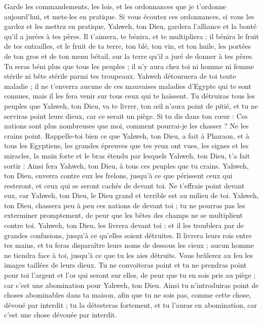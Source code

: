 \begin{multicols}{2}
Garde les commandements, les lois, et les ordonnances que je t’ordonne aujourd'hui, et mets-les en pratique.
Si vous écoutez ces ordonnances, si vous les gardez et les mettez en pratique, Yahweh, ton Dieu, gardera l'alliance et la bonté qu'il a jurées à tes pères.
Il t'aimera, te bénira, et te multipliera ; il bénira le fruit de tes entrailles, et le fruit de ta terre, ton blé, ton vin, et ton huile, les portées de ton gros et de ton menu bétail, sur la terre qu'il a juré de donner à tes pères.
Tu seras béni plus que tous les peuples ; il n'y aura chez toi ni homme ni femme stérile ni bête stérile parmi tes troupeaux.
Yahweh détournera de toi toute maladie ; il ne t’enverra aucune de ces mauvaises maladies d'Egypte qui te sont connues, mais il les fera venir sur tous ceux qui te haïssent.
Tu détruiras tous les peuples que Yahweh, ton Dieu, va te livrer, ton œil n’aura point de pitié, et tu ne serviras point leurs dieux, car ce serait un piège.
Si tu dis dans ton cœur : Ces nations sont plus nombreuses que moi, comment pourrai-je les chasser ?
Ne les crains point. Rappelle-toi bien ce que Yahweh, ton Dieu, a fait à Pharaon, et à tous les Egyptiens,
les grandes épreuves que tes yeux ont vues, les signes et les miracles, la main forte et le bras étendu par lesquels Yahweh, ton Dieu, t'a fait sortir : Ainsi fera Yahweh, ton Dieu, à tous ces peuples que tu crains.
Yahweh, ton Dieu, enverra contre eux les frelons, jusqu'à ce que périssent ceux qui resteront, et ceux qui se seront cachés de devant toi.
Ne t'effraie point devant eux, car Yahweh, ton Dieu, le Dieu grand et terrible est au milieu de toi.
Yahweh, ton Dieu, chassera peu à peu ces nations de devant toi ; tu ne pourras pas les exterminer promptement, de peur que les bêtes des champs ne se multiplient contre toi.
Yahweh, ton Dieu, les livrera devant toi ; et il les troublera par de grandes confusions, jusqu'à ce qu'elles soient détruites.
Il livrera leurs rois entre tes mains, et tu feras disparaître leurs noms de dessous les cieux ; aucun homme ne tiendra face à toi, jusqu'à ce que tu les aies détruits.
Vous brûlerez au feu les images taillées de leurs dieux. Tu ne convoiteras point et tu ne prendras point pour toi l'argent et l'or qui seront sur elles, de peur que tu en sois pris au piège ; car c'est une abomination pour Yahweh, ton Dieu.
Ainsi tu n'introduiras point de choses abominables dans ta maison, afin que tu ne sois pas, comme cette chose, dévoué par interdit ; tu la détesteras fortement, et tu l’auras en abomination, car c'est une chose dévouée par interdit.

\end{multicols}
